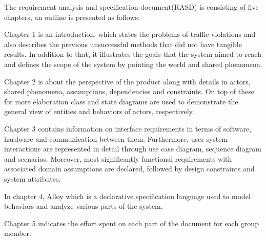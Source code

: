 The requirement analysis and specification document(RASD) is consisting of five chapters, an outline is presented as follows:

Chapter 1 is an introduction, which states the problems of traffic violations and also describes the previous unsuccessful methods that did not have tangible results. In addition to that, it illustrates the goals that the system aimed to reach and defines the scope of the system by pointing the world and shared phenomena.

Chapter 2 is about the perspective of the product along with details in actors, shared phenomena, assumptions, dependencies and constraints. On top of these for more elaboration class and state diagrams are used to demonstrate the general view of entities and behaviors of actors, respectively.

Chapter 3 contains information on interface requirements in terms of software, hardware and communication between them. Furthermore, user system interactions are represented in detail through use case diagram, sequence diagram and scenarios. Moreover, most significantly functional requirements with associated domain assumptions are declared, followed by design constraints and system attributes.

In chapter 4, Alloy which is a declarative specification language used to model behaviors and analyze various parts of the system.

Chapter 5 indicates the effort spent on each part of the document for each group member.
